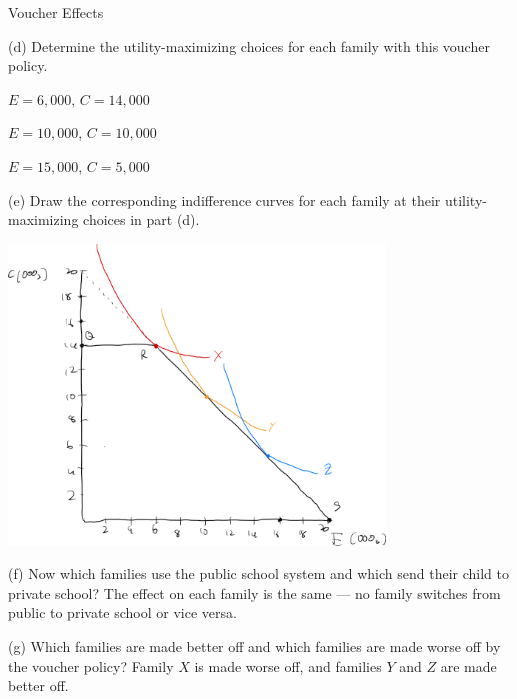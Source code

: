 \documentclass[10pt]{extarticle}
\begin{document}
\begin{problem}{Voucher Effects}
\begin{center}
    \end{center}
    \begin{problem}{(d)}
      Determine the utility-maximizing choices for each family with this voucher policy.
      \tcblower
      \begin{description}[font=\normalfont]
        \item[Family $X$:] $E = 6,000$, $C = 14,000$
        \item[Family $Y$:] $E = 10,000$, $C = 10,000$
        \item[Family $Z$:] $E = 15,000$, $C = 5,000$
      \end{description}
    \end{problem}
    \begin{problem}{(e)}
      Draw the corresponding indifference curves for each family at their utility-maximizing choices in part (d).
      \tcblower
      \begin{center}
        \includegraphics[width=10cm]{4_2_d}
      \end{center}
    \end{problem}
    \begin{problem}{(f)}
      Now which families use the public school system and which send their child to private school?
      \tcblower
      The effect on each family is the same --- no family switches from public to private school or vice versa.
    \end{problem}
    \begin{problem}{(g)}
      Which families are made better off and which families are made worse off by the voucher policy?
      \tcblower
      Family $X$ is made worse off, and families $Y$ and $Z$ are made better off.
    \end{problem}
  \end{problem}
\end{document}
